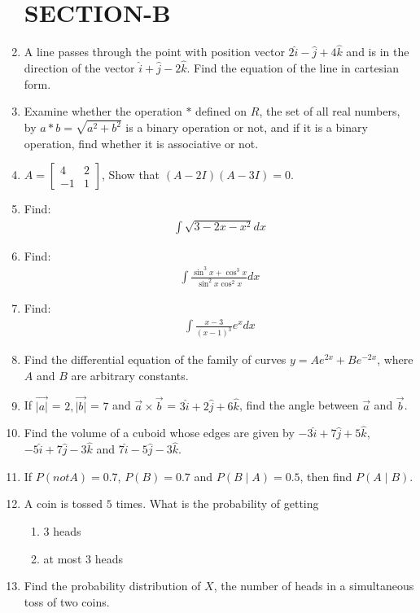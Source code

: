 \documentclass[12pt,letterpaper]{article}
\newcommand{\mydet}[1]{\left| #1 \right|}
\newcommand{\brak}[1]{\left( #1 \right)}
\newcommand{\mydat}[4]{\begin{bmatrix} #1 & #2 \\ #3 & #4 \end{bmatrix}}
\begin{document}
\begin{enumerate}
\section*{SECTION-B}
\item A line passes through the point with position vector $2\hat{i}-\hat{j}+4\hat{k}$ and is in the direction of the vector $\hat{i}+\hat{j}-2\hat{k}$. Find the equation of the line in cartesian form.
\item Examine whether the operation $*$ defined on ${R}$, the set of all real numbers, by $a * b = \sqrt{a^2+b^2}$ is a binary operation or not, and if it is a binary operation, find whether it is associative or not.
\item ${A}= \mydat{4}{2}{-1}{1}$, Show that $({A} - 2{I})({A} - 3{I}) = 0$.
\item Find:\begin{align*}\int\sqrt{3-2x-x^2}dx\end{align*}
\item Find: \begin{align*}\int{\frac{\sin^3{x}+\cos^3{x}}{\sin^2{x}\cos^2{x}}}dx\end{align*}
\item Find: \begin{align*}\int{\frac{x-3}{\brak{x-1}^3}}e^x 
dx\end{align*}
\item Find the differential equation of the family of curves \(y = Ae^{2x} + Be^{-2x}\), where \(A\) and \(B\) are arbitrary constants.
\item If ${\overrightarrow{\mydet{a}}}$ = $2, {\overrightarrow{\mydet{b}}}$ = $7$ and $\overrightarrow{a}\times\overrightarrow{b}$ = $3\hat{i}+2\hat{j}+6\hat{k}$, find the angle between $\overrightarrow{a}$ and $\overrightarrow{b}$.
\item Find the volume of a cuboid whose edges are given by $-3\hat{i}+7\hat{j}+5\hat{k}$,$-5\hat{i}+7\hat{j}-3\hat{k}$ and $7\hat{i}-5\hat{j}-3\hat{k}$.
\item If $P(not A) =0.7$, $P(B)=0.7$ and $P(B\mid A)=0.5$, then find $P(A\mid B)$.
\item A coin is tossed $5$ times. What is the probability of getting 
\begin{enumerate}[label=(\roman*)]
    \item $3$ heads
    \item at most $3$ heads
\end{enumerate}
\item Find the probability distribution of $X$, the number of heads in a simultaneous toss of two coins.

\end{enumerate}
\end{document}
